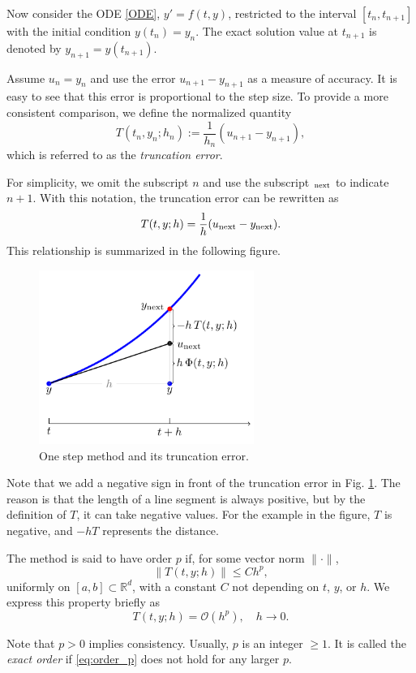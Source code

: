\documentclass[10pt]{amsart}
\begin{document}
Now consider the ODE \eqref{ODE}, $y' = f(t, y)$, restricted to the interval $[t_n, t_{n+1}]$ with the initial condition $y(t_n) = y_n$. The exact solution value at $t_{n+1}$ is denoted by $y_{n+1} = y(t_{n+1})$.  

Assume $u_n = y_n$ and use the error $u_{n+1} - y_{n+1}$ as a measure of accuracy. It is easy to see that this error is proportional to the step size. To provide a more consistent comparison, we define the normalized quantity  
$$T(t_n, y_n; h_n) := \frac{1}{h_n}(u_{n+1} - y_{n+1}),$$  
which is referred to as the {\em truncation error}.  

For simplicity, we omit the subscript $n$ and use the subscript $_{\rm next}$ to indicate $n+1$. With this notation, the truncation error can be rewritten as  
$$T(t, y; h) = \frac{1}{h}(u_{\rm next} - y_{\rm next}).$$  
This relationship is summarized in the following figure.  

\begin{figure}[htbp]
\begin{center}
\includegraphics[width=7cm]{figures/TruncationError.pdf}
\caption{One step method and its truncation error.}
\label{fig:Th}
\end{center}
\end{figure}

Note that we add a negative sign in front of the truncation error in Fig. \ref{fig:Th}. The reason is that the length of a line segment is always positive, but by the definition of $T$, it can take negative values. For the example in the figure, $T$ is negative, and $-hT$ represents the distance.  

\begin{definition}
The method is said to have order $p$ if, for some vector norm $\|\cdot\|$,  
\begin{equation}\label{eq:order_p}
\|T(t, y; h)\| \leq C h^p,  
\end{equation}  
uniformly on $[a, b] \subset \mathbb{R}^d$, with a constant $C$ not depending on $t$, $y$, or $h$.  
We express this property briefly as  
\begin{equation}\label{eq:order_bigO}
T(t, y; h) = \mathcal{O}(h^p), \quad h \to 0.  
\end{equation}  

Note that $p > 0$ implies consistency. Usually, $p$ is an integer $\geq 1$. It is called the \emph{exact order} if \eqref{eq:order_p} does not hold for any larger $p$.  
\end{definition}
\end{document}
